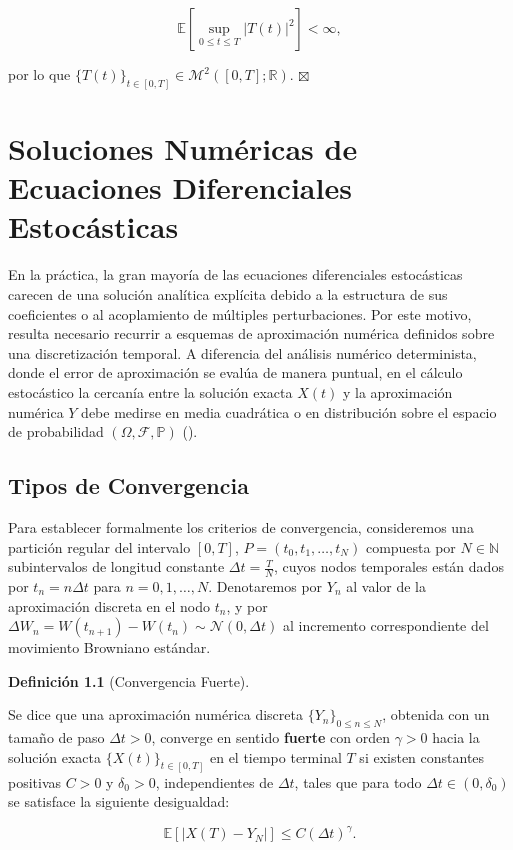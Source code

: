 \documentclass[
  spanish,
  us-letterpaper,
]{scrreprt}
\numberwithin{equation}{section}
\theoremstyle{plain}
\theoremstyle{plain}
\theoremstyle{plain}
\theoremstyle{definition}
\newtheorem{definition}{Definición}[chapter]
\theoremstyle{remark}
\begin{document}
\[
\mathbb{E}\left[ \sup_{0 \le t \le T} \vert T(t) \vert^2 \right] < \infty,
\]

por lo que
\(\{T(t)\}_{t \in [0, T]} \in \mathcal{M}^2([0, T]; \mathbb{R})\).
\(\boxtimes\)

\chapter{Soluciones Numéricas de Ecuaciones Diferenciales
Estocásticas}\label{sec-numerico}

En la práctica, la gran mayoría de las ecuaciones diferenciales
estocásticas carecen de una solución analítica explícita debido a la
estructura de sus coeficientes o al acoplamiento de múltiples
perturbaciones. Por este motivo, resulta necesario recurrir a esquemas
de aproximación numérica definidos sobre una discretización temporal. A
diferencia del análisis numérico determinista, donde el error de
aproximación se evalúa de manera puntual, en el cálculo estocástico la
cercanía entre la solución exacta \(X(t)\) y la aproximación numérica
\(Y\) debe medirse en media cuadrática o en distribución sobre el
espacio de probabilidad \((\Omega, \mathcal{F}, \mathbb{P})\)
().

\section{Tipos de Convergencia}\label{tipos-de-convergencia}

Para establecer formalmente los criterios de convergencia, consideremos
una partición regular del intervalo \([0, T]\),
\(P = (t_0, t_1, \dots, t_N)\) compuesta por \(N \in \mathbb{N}\)
subintervalos de longitud constante \(\Delta t = \frac{T}{N}\), cuyos
nodos temporales están dados por \(t_n = n \Delta t\) para
\(n = 0, 1, \dots, N\). Denotaremos por \(Y_n\) al valor de la
aproximación discreta en el nodo \(t_n\), y por
\(\Delta W_n = W(t_{n+1}) - W(t_n) \sim \mathcal{N}(0, \Delta t)\) al
incremento correspondiente del movimiento Browniano estándar.

\begin{definition}[Convergencia
Fuerte]\protect\hypertarget{def-convergencia-fuerte}{}\label{def-convergencia-fuerte}

Se dice que una aproximación numérica discreta
\(\{Y_n\}_{0 \le n \le N}\), obtenida con un tamaño de paso
\(\Delta t > 0\), converge en sentido \textbf{fuerte} con orden
\(\gamma > 0\) hacia la solución exacta \(\{X(t)\}_{t \in [0, T]}\) en
el tiempo terminal \(T\) si existen constantes positivas \(C > 0\) y
\(\delta_0 > 0\), independientes de \(\Delta t\), tales que para todo
\(\Delta t \in (0, \delta_0)\) se satisface la siguiente desigualdad:

\[
\mathbb{E}\left[ \vert X(T) - Y_N \vert \right] \le C (\Delta t)^\gamma.
\]

\end{definition}
\end{document}
